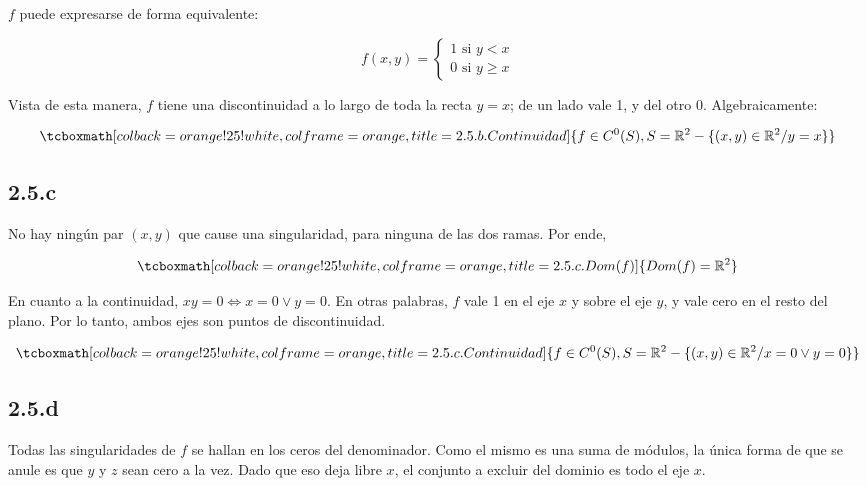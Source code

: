 \documentclass{article}
\renewcommand{\Bbb}{\mathbb}
\begin{document}
$f$ puede expresarse de forma equivalente:

\begin{equation}
f(x,y) = \left\{ \begin{array}{ll}
1 \text{ si } y < x \\
0 \text{ si } y \geq x
\end{array} \right.
\end{equation}

Vista de esta manera, $f$ tiene una discontinuidad a lo largo de toda la recta $y = x$; de un lado vale 1, y del otro 0. Algebraicamente:

\begin{equation}
\tcboxmath[colback=orange!25!white,colframe=orange,title=2.5.b. Continuidad ]
{ f \in C^0(S), S = \Bbb R^2 - \{ (x,y) \in \Bbb R^2 / y = x \} }
\end{equation}

\subsection*{2.5.c}
\label{subsec:2.5.c}

No hay ningún par $(x,y)$ que cause una singularidad, para ninguna de las dos ramas. Por ende,

\begin{equation}
\tcboxmath[colback=orange!25!white,colframe=orange,title=2.5.c. Dom(f) ]
{ \mathop{Dom}(f) = \Bbb R^2 }
\end{equation}

En cuanto a la continuidad, $xy = 0 \Leftrightarrow x = 0 \vee y = 0$. En otras palabras, $f$ vale 1 en el eje $x$ y sobre el eje $y$, y vale cero en el resto del plano. Por lo tanto, ambos ejes son puntos de discontinuidad.

\begin{equation}
\tcboxmath[colback=orange!25!white,colframe=orange,title=2.5.c. Continuidad ]
{ f \in C^0(S), S = \Bbb R^2 - \{ (x,y) \in \Bbb R^2 / x = 0 \vee y = 0 \} }
\end{equation}

\subsection*{2.5.d}
\label{subsec:2.5.d}

Todas las singularidades de $f$ se hallan en los ceros del denominador. Como el mismo es una suma de módulos, la única forma de que se anule es que $y$ y $z$ sean cero a la vez. Dado que eso deja libre $x$, el conjunto a excluir del dominio es todo el eje $x$.
\end{document}
